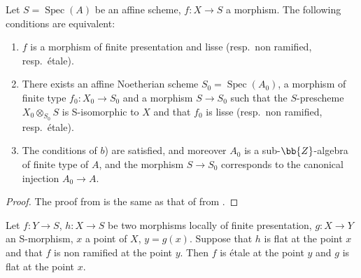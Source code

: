 \begin{corollary}[17.7.9]
\label{IV.17.7.9}
Let $S=\operatorname{Spec}(A)$ be an affine scheme, $f:X\to S$ a morphism.
The following conditions are equivalent:
\begin{enumerate}
  \item[a)] $f$ is a morphism of finite presentation and lisse (resp.\ non ramified, resp.\ \'etale).
  \item[b)] There exists an affine Noetherian scheme $S_0=\operatorname{Spec}(A_0)$, a morphism of finite type $f_0:X_0\to S_0$ and a morphism $S\to S_0$ such that the $S$-prescheme $X_0\otimes_{S_0} S$ is S-isomorphic to $X$ and that $f_0$ is lisse (resp.\ non ramified, resp.\ \'etale).
  \item[c)] The conditions of $b$) are satisfied, and moreover $A_0$ is a sub-$\bb{Z}$-algebra of finite type of $A$, and the morphism $S\to S_0$ corresponds to the canonical injection $A_0\to A$.
\end{enumerate}
\end{corollary}

\begin{proof}
The proof from  is the same as that of  from .
\end{proof}

\begin{proposition}[17.7.10]
\label{IV.17.7.10}
Let $f:Y\to S$, $h:X\to S$ be two morphisms locally of finite presentation, $g:X\to Y$ an S-morphism, $x$ a point of $X$, $y=g(x)$.
Suppose that $h$ is flat at the point $x$ and that $f$ is non ramified at the point $y$.
Then $f$ is \'etale at the point $y$ and $g$ is flat at the point $x$.
\end{proposition}

